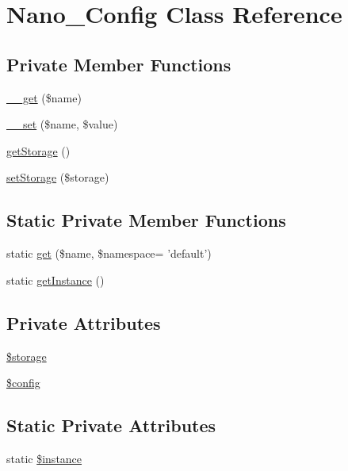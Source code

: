 \hypertarget{classNano__Config}{
\section{Nano\_\-Config Class Reference}
\label{classNano__Config}
}
\subsection*{Private Member Functions}
\begin{CompactItemize}
\item 
\hyperlink{classNano__Config_f231df8e3498c7a3a4ef241bebe2a6ff}{\_\-\_\-get} (\$name)
\item 
\hyperlink{classNano__Config_4f62ccee4fa70aae58ac8aaab3797450}{\_\-\_\-set} (\$name, \$value)
\item 
\hyperlink{classNano__Config_c82ad6325a613816b8e82645d8467db3}{getStorage} ()
\item 
\hyperlink{classNano__Config_3cbc80940173ab688678e5992815d37d}{setStorage} (\$storage)
\end{CompactItemize}
\subsection*{Static Private Member Functions}
\begin{CompactItemize}
\item 
static \hyperlink{classNano__Config_ba68e7083da2ef2e7437bddef42f6deb}{get} (\$name, \$namespace= 'default')
\item 
static \hyperlink{classNano__Config_d9856effe206bf69ac033daca3384abc}{getInstance} ()
\end{CompactItemize}
\subsection*{Private Attributes}
\begin{CompactItemize}
\item 
\hyperlink{classNano__Config_802966f82c86ebde44ec49cec9264164}{\$storage}
\item 
\hyperlink{classNano__Config_8f77d6434e226b0493188a9c583c845b}{\$config}
\end{CompactItemize}
\subsection*{Static Private Attributes}
\begin{CompactItemize}
\item 
static \hyperlink{classNano__Config_1631ccf8dc16c6c4e55ef31657d46c7e}{\$instance}
\end{CompactItemize}


